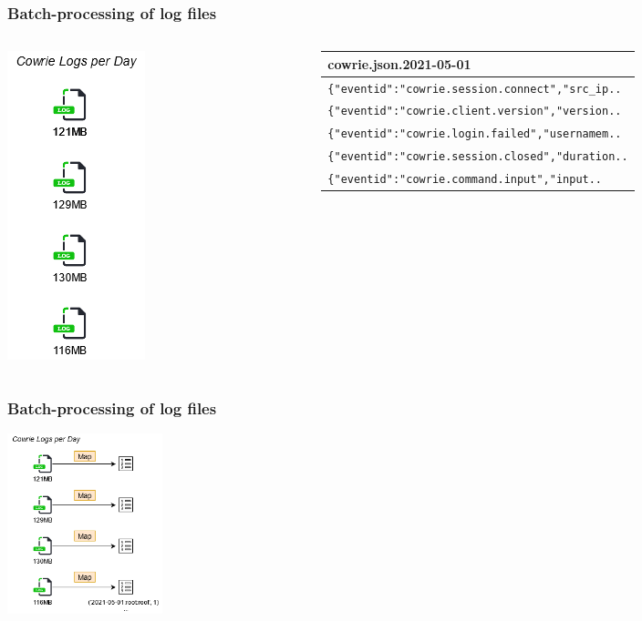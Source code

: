 \documentclass[11pt,t,usepdftitle=false,aspectratio=169]{beamer}
\begin{document}
\begin{frame}[fragile] 
	\frametitle{Batch-processing of log files}	
	\begin{columns}
		\begin{column}{0.3\textwidth}
		\includegraphics[width=18mm\textwidth]{_images/MapReduce-Visualization-01.png}
		\end{column}	
		\begin{column}{0.7\textwidth}
			\begin{tabular}{l}
			\hline
			cowrie.json.2021-05-01  \\
			\hline
			\verb|{"eventid":"cowrie.session.connect","src_ip..|      \\
			\verb|{"eventid":"cowrie.client.version","version..|   \\
			\verb|{"eventid":"cowrie.login.failed","usernamem..|   \\
			\verb|{"eventid":"cowrie.session.closed","duration..|     \\
			\verb|{"eventid":"cowrie.command.input","input..|    \\
				\hline
			\end{tabular}
		\end{column}
	\end{columns}
\end{frame}

\begin{frame}[fragile]
	\frametitle{Batch-processing of log files}	
	\begin{center}
		\includegraphics[width=45mm]{_images/MapReduce-Visualization-02.png}
	\end{center}
\end{frame}
\end{document}
